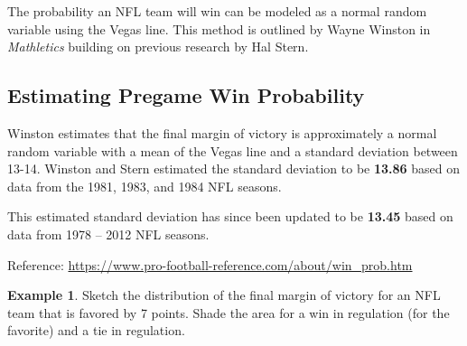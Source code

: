 \documentclass[
  11pt,
]{book}
\theoremstyle{definition}
\theoremstyle{definition}
\newtheorem{example}{Example}[chapter]
\theoremstyle{definition}
\theoremstyle{definition}
\theoremstyle{remark}
\begin{document}
The probability an NFL team will win can be modeled as a normal random variable using the Vegas line. This method is outlined by Wayne Winston in \emph{Mathletics} building on previous research by Hal Stern.

\hypertarget{estimating-pregame-win-probability}{%
\subsection{Estimating Pregame Win Probability}\label{estimating-pregame-win-probability}}

Winston estimates that the final margin of victory is approximately a normal random variable with a mean of the Vegas line and a standard deviation between 13-14. Winston and Stern estimated the standard deviation to be \textbf{13.86} based on data from the 1981, 1983, and 1984 NFL seasons.

This estimated standard deviation has since been updated to be \textbf{13.45} based on data from 1978 -- 2012 NFL seasons.

Reference: \url{https://www.pro-football-reference.com/about/win_prob.htm}

\begin{example}
Sketch the distribution of the final margin of victory for an NFL team that is favored by 7 points. Shade the area for a win in regulation (for the favorite) and a tie in regulation.
\end{example}
\end{document}
